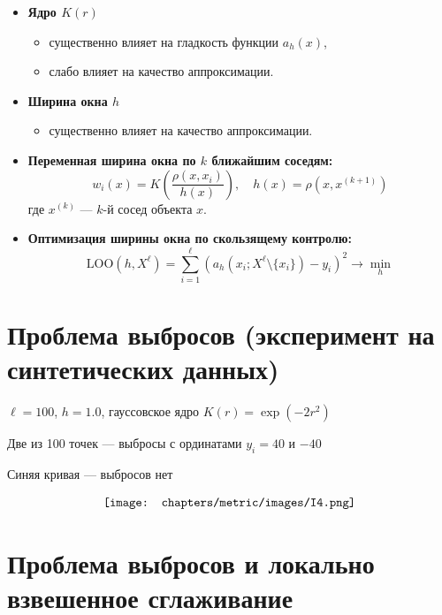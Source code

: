 \begin{itemize}
    \item \textbf{Ядро \(K(r)\)}
    \begin{itemize}
        \item существенно влияет на гладкость функции \( a_h(x) \),
        \item слабо влияет на качество аппроксимации.
    \end{itemize}
    \item \textbf{Ширина окна \(h\)}
    \begin{itemize}
        \item существенно влияет на качество аппроксимации.
    \end{itemize}
    \item \textbf{Переменная ширина окна по \(k\) ближайшим соседям:}
    \[
    w_i(x) = K\left( \frac{\rho(x, x_i)}{h(x)} \right), \quad h(x) = \rho(x, x^{(k+1)})
    \]
    где \(x^{(k)}\) — \(k\)-й сосед объекта \(x\).

    \item \textbf{Оптимизация ширины окна по скользящему контролю:}
    \[
    \text{LOO}(h, X^\ell) = \sum_{i=1}^\ell \left( a_h(x_i; X^\ell \setminus \{x_i\}) - y_i \right)^2 \to \min_h
    \]
\end{itemize}

\section*{Проблема выбросов (эксперимент на синтетических данных)}

\noindent
\(\ell = 100\), \(h = 1.0\), гауссовское ядро \(K(r) = \exp(-2r^2)\)

\vspace{0.5em}

{\color{red}Две из 100 точек — выбросы с ординатами \(y_i = 40\) и \(-40\)}

\vspace{0.5em}

{\color{blue}Синяя кривая — выбросов нет}

\begin{align*}
    \centering
    \texttt{[image: chapters/metric/images/I4.png]}
    \label{fig:kernel_triangle-2}
\end{align*}

\section*{Проблема выбросов и локально взвешенное сглаживание}

